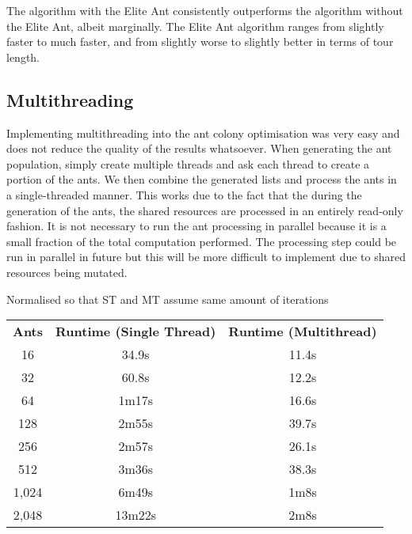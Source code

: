 \documentclass[a4paper, 11pt,table]{article}
\begin{document}
	The algorithm with the Elite Ant consistently outperforms the algorithm without the Elite Ant, albeit marginally. The Elite Ant algorithm ranges from slightly faster to much faster, and from slightly worse to slightly better in terms of tour length.
	
	\subsection{Multithreading}
	Implementing multithreading into the ant colony optimisation was very easy and does not reduce the quality of the results whatsoever. When generating the ant population, simply create multiple threads and ask each thread to create a portion of the ants. We then combine the generated lists and process the ants in a single-threaded manner. This works due to the fact that the during the generation of the ants, the shared resources are processed in an entirely read-only fashion. It is not necessary to run the ant processing in parallel because it is a small fraction of the total computation performed. The processing step could be run in parallel in future but this will be more difficult to implement due to shared resources being mutated.
	
	\begin{center}
		Normalised so that ST and MT assume same amount of iterations
		
		\begin{tabu}{|c c c|}
			\textbf{Ants} & \textbf{Runtime (Single Thread)} & \textbf{Runtime (Multithread)} \\
			16            & 34.9s                            & 11.4s                          \\
			32            & 60.8s                            & 12.2s                          \\
			64            & 1m17s                            & 16.6s                          \\
			128           & 2m55s                            & 39.7s                          \\
			256           & 2m57s                            & 26.1s                          \\
			512           & 3m36s                            & 38.3s                          \\
			1,024         & 6m49s                            & 1m8s                           \\
			2,048         & 13m22s                           & 2m8s                           \\
		\end{tabu}
	\end{center}
	
\end{document}
